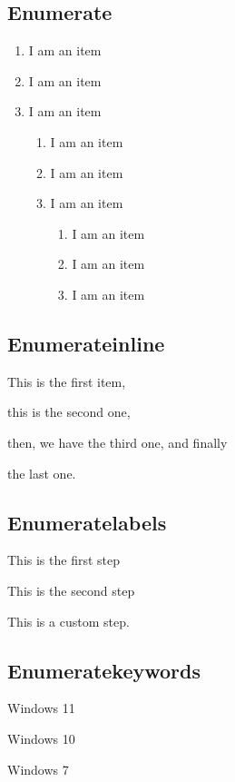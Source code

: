 \documentclass[a4paper,10pt,oneside]{scrartcl}
\begin{document}
\subsection{Enumerate}
\begin{enumerate}
  \item I am an item
  \item I am an item
  \item I am an item
        \begin{enumerate}
          \item I am an item
          \item I am an item
          \item I am an item
                \begin{enumerate}
                  \item I am an item
                  \item I am an item
                  \item I am an item
                \end{enumerate}
        \end{enumerate}
\end{enumerate}

\subsection{Enumerateinline}
\begin{enumerateinline}
  \item This is the first item,
  \item this is the second one,
  \item then, we have the third one, and finally
  \item the last one.
\end{enumerateinline}

\subsection{Enumeratelabels}
\begin{enumeratelabels}[label={Step \arabic{*}:}]
  \item This is the first step
  \item This is the second step
  \item[Custom] This is a custom step.
\end{enumeratelabels}

\subsection{Enumeratekeywords}
\begin{enumeratekeywords}
  \item[Win11] Windows 11
  \item[Win10] Windows 10
  \item[Win7] Windows 7
\end{enumeratekeywords}
\end{document}
